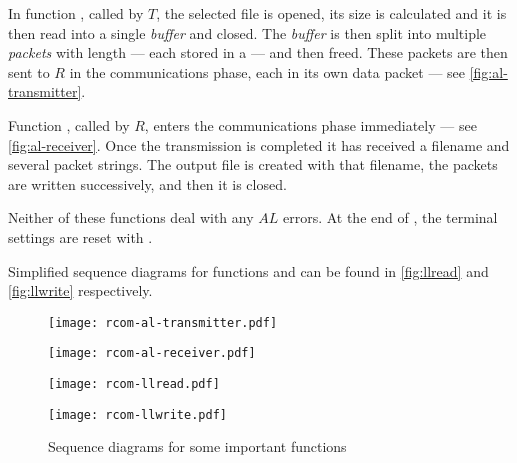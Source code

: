 \documentclass[main.tex]{subfiles}
\begin{document}
In function , called by $T$, the selected file is opened, its size is calculated and it is then read into a single \emph{buffer} and closed. The \emph{buffer} is then split into multiple \emph{packets} with length  --- each stored in a  --- and then freed. These packets are then sent to $R$ in the communications phase, each in its own data packet --- see \autoref{fig:al-transmitter}.

Function , called by $R$, enters the communications phase immediately --- see \autoref{fig:al-receiver}. Once the transmission is completed it has received a filename and several packet strings. The output file is created with that filename, the packets are written successively, and then it is closed.

Neither of these functions deal with any $AL$ errors. At the end of , the terminal settings are reset with .

Simplified sequence diagrams for functions  and  can be found in \autoref{fig:llread} and \autoref{fig:llwrite} respectively.

\begin{figure}[ph]
	\caption{Sequence diagrams for some important functions\label{fig:seqdiagrams}}
		
	\begin{minipage}{0.5\textwidth}
		\centering
		\texttt{[image: rcom-al-transmitter.pdf]}
	\end{minipage}
	\begin{minipage}{0.5\textwidth}
		\centering
		\texttt{[image: rcom-al-receiver.pdf]}
	\end{minipage}
	\begin{minipage}{0.5\textwidth}
		\centering
		\texttt{[image: rcom-llread.pdf]}
	\end{minipage}
	\begin{minipage}{0.5\textwidth}
		\centering
		\texttt{[image: rcom-llwrite.pdf]}
	\end{minipage}
\end{figure}
\end{document}
